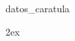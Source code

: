 \documentclass[12pt, a4paper]{article}
\begin{document}
     {datos_caratula}

    \small
    \newpage \printindex
    \normalsize
    
	

    \newpage	
    \begingroup
        \parindent 0pt
        \parskip 2ex
        \def\enotesize{\normalsize}
    \endgroup
\end{document}
